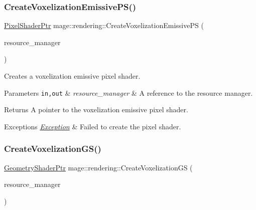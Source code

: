 \subsubsection{\texorpdfstring{Create\+Voxelization\+Emissive\+P\+S()}{CreateVoxelizationEmissivePS()}}
{\footnotesize\ttfamily \mbox{\hyperlink{namespacemage_1_1rendering_af03d922b228ee9c8542baaa2ecc9f259}{Pixel\+Shader\+Ptr}} mage\+::rendering\+::\+Create\+Voxelization\+Emissive\+PS (\begin{DoxyParamCaption}\item[{\mbox{\hyperlink{classmage_1_1rendering_1_1_resource_manager}{Resource\+Manager}} \&}]{resource\+\_\+manager }\end{DoxyParamCaption})}

Creates a voxelization emissive pixel shader.


\begin{DoxyParams}[1]{Parameters}
\mbox{\tt in,out}  & {\em resource\+\_\+manager} & A reference to the resource manager. \\
\hline
\end{DoxyParams}
\begin{DoxyReturn}{Returns}
A pointer to the voxelization emissive pixel shader. 
\end{DoxyReturn}

\begin{DoxyExceptions}{Exceptions}
{\em \mbox{\hyperlink{classmage_1_1_exception}{Exception}}} & Failed to create the pixel shader. \\
\hline
\end{DoxyExceptions}
\mbox{\label{namespacemage_1_1rendering_af7219f5585837c13b6b60e1d6604bca5}} 
\subsubsection{\texorpdfstring{Create\+Voxelization\+G\+S()}{CreateVoxelizationGS()}}
{\footnotesize\ttfamily \mbox{\hyperlink{namespacemage_1_1rendering_aa5d63f80f9483d0896718813768ba1cf}{Geometry\+Shader\+Ptr}} mage\+::rendering\+::\+Create\+Voxelization\+GS (\begin{DoxyParamCaption}\item[{\mbox{\hyperlink{classmage_1_1rendering_1_1_resource_manager}{Resource\+Manager}} \&}]{resource\+\_\+manager }\end{DoxyParamCaption})}

